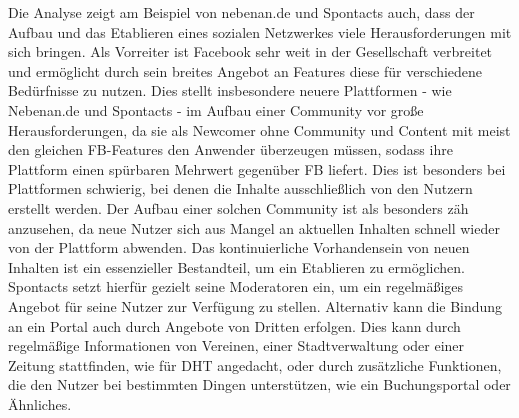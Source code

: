 Die Analyse zeigt am Beispiel von nebenan.de und Spontacts auch, dass der Aufbau und das Etablieren eines sozialen Netzwerkes viele Herausforderungen mit sich bringen. Als Vorreiter ist Facebook sehr weit in der Gesellschaft verbreitet und ermöglicht durch sein breites Angebot an Features diese für verschiedene Bedürfnisse zu nutzen.
Dies stellt insbesondere neuere Plattformen - wie Nebenan.de und Spontacts - im Aufbau einer Community vor große Herausforderungen, da sie als Newcomer ohne Community und Content mit meist den gleichen FB-Features den Anwender überzeugen müssen, sodass ihre Plattform einen spürbaren Mehrwert gegenüber FB liefert. Dies ist besonders bei Plattformen schwierig, bei denen die Inhalte ausschließlich von den Nutzern erstellt werden. Der Aufbau einer solchen Community ist als besonders zäh anzusehen, da neue Nutzer sich aus Mangel an aktuellen Inhalten schnell wieder von der Plattform abwenden.
Das kontinuierliche Vorhandensein von neuen Inhalten ist ein essenzieller Bestandteil, um ein Etablieren zu ermöglichen. Spontacts setzt hierfür gezielt seine Moderatoren ein, um ein regelmäßiges Angebot für seine Nutzer zur Verfügung zu stellen. Alternativ kann die Bindung an ein Portal auch durch Angebote von Dritten erfolgen. Dies kann \bspw durch regelmäßige Informationen von Vereinen, einer Stadtverwaltung oder einer Zeitung stattfinden, wie für DHT angedacht, oder durch zusätzliche Funktionen, die den Nutzer bei bestimmten Dingen unterstützen, wie \zB ein Buchungsportal oder Ähnliches.
